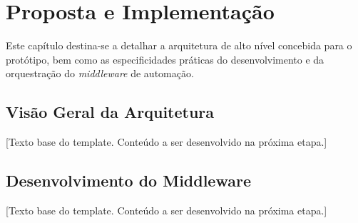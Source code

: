 \chapter{Proposta e Implementação}
\label{chap:proposta_implementacao}

Este capítulo destina-se a detalhar a arquitetura de alto nível concebida para o protótipo, bem como as especificidades práticas do desenvolvimento e da orquestração do \textit{middleware} de automação.

\section{Visão Geral da Arquitetura}
\label{sec:visao_arquitetura}

[Texto base do template. Conteúdo a ser desenvolvido na próxima etapa.]

\section{Desenvolvimento do Middleware}
\label{sec:desenvolvimento_middleware}

[Texto base do template. Conteúdo a ser desenvolvido na próxima etapa.]
